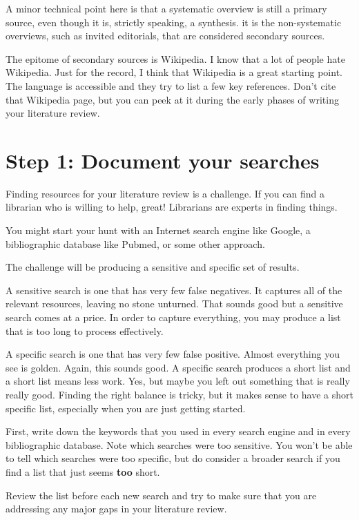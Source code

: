 \documentclass[
  letterpaper,
  DIV=11,
  numbers=noendperiod]{scrreprt}
\begin{document}
\begin{tcolorbox}
A minor technical point here is that a systematic overview is still a
primary source, even though it is, strictly speaking, a synthesis. it is
the non-systematic overviews, such as invited editorials, that are
considered secondary sources.

The epitome of secondary sources is Wikipedia. I know that a lot of
people hate Wikipedia. Just for the record, I think that Wikipedia is a
great starting point. The language is accessible and they try to list a
few key references. Don't cite that Wikipedia page, but you can peek at
it during the early phases of writing your literature review.

\section{Step 1: Document your
searches}\label{step-1-document-your-searches}

Finding resources for your literature review is a challenge. If you can
find a librarian who is willing to help, great! Librarians are experts
in finding things.

You might start your hunt with an Internet search engine like Google, a
bibliographic database like Pubmed, or some other approach.

The challenge will be producing a sensitive and specific set of results.

A sensitive search is one that has very few false negatives. It captures
all of the relevant resources, leaving no stone unturned. That sounds
good but a sensitive search comes at a price. In order to capture
everything, you may produce a list that is too long to process
effectively.

A specific search is one that has very few false positive. Almost
everything you see is golden. Again, this sounds good. A specific search
produces a short list and a short list means less work. Yes, but maybe
you left out something that is really really good. Finding the right
balance is tricky, but it makes sense to have a short specific list,
especially when you are just getting started.

First, write down the keywords that you used in every search engine and
in every bibliographic database. Note which searches were too sensitive.
You won't be able to tell which searches were too specific, but do
consider a broader search if you find a list that just seems
\textbf{too} short.

Review the list before each new search and try to make sure that you are
addressing any major gaps in your literature review.


\end{tcolorbox}
\end{document}
